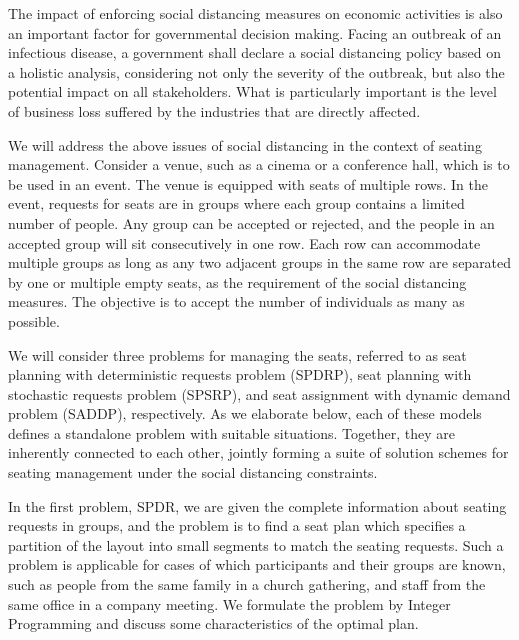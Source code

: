 The impact of enforcing social distancing measures on economic activities is also an important factor for governmental decision making. Facing an outbreak of an infectious disease, a government shall declare a social distancing policy based on a holistic analysis, considering not only the severity of the outbreak, but also the potential impact on all stakeholders. What is particularly important is the level of business loss suffered by the industries that are directly affected.  



We will address the above issues of social distancing in the context of seating management. Consider a venue, such as a cinema or a conference hall, which is to be used in an event. The venue is equipped with seats of multiple rows. In the event, requests for seats are in groups where each group contains a limited number of people. Any group can be accepted or rejected, and the people in an accepted group  will sit consecutively in one row. Each row can accommodate multiple groups as long as any two adjacent groups in the same row are separated by one or multiple empty seats, as the requirement of the social distancing measures. The objective is to accept the number of individuals as many as possible.

We will consider three problems for managing the seats, referred to as seat planning with deterministic requests problem (SPDRP), seat planning with stochastic requests problem (SPSRP), and seat assignment with dynamic demand problem (SADDP), respectively. As we elaborate below, each of these models defines a standalone problem with suitable situations. Together, they are inherently connected to each other, jointly forming a suite of solution schemes for seating management under the social distancing constraints.

In the first problem, SPDR, we are given the complete information about seating requests in groups, and the problem is to find a seat plan which specifies a partition of the layout into small segments to match the seating requests. Such a problem is applicable for cases of which participants and their groups are known, such as people from the same family in a church gathering, and staff from the same office in a company meeting. We formulate the problem by Integer Programming and discuss some characteristics of the optimal plan.
 
